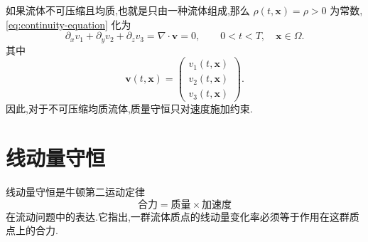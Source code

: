 \begin{note}[不可压缩均质流体]\label{note:incompressible-homogeneous}
如果流体不可压缩且均质,也就是只由一种流体组成,那么 $\rho(t,\bm{x})=\rho>0$ 为常数,\cref{eq:continuity-equation} 化为
\begin{equation}\label{eq:divergence-free}
  \partial_x v_1+\partial_y v_2+\partial_z v_3
  =\nabla\cdot\bm{v}=0,
  \qquad 0<t<T,\quad\bm{x}\in\Omega.
\end{equation}
其中
\begin{equation*}
  \bm{v}(t,\bm{x})=
  \begin{pmatrix}v_1(t,\bm{x})\\v_2(t,\bm{x})\\v_3(t,\bm{x})\end{pmatrix}.
\end{equation*}
因此,对于不可压缩均质流体,质量守恒只对速度施加约束.
\end{note}

\section{线动量守恒}\label{sec:momentum-conservation}

\begin{note}[牛顿第二运动定律]\label{note:newton-second-law}
线动量守恒是牛顿第二运动定律
\begin{equation}\label{eq:newton-second-law}
  \text{合力}=\text{质量}\times\text{加速度}
\end{equation}
在流动问题中的表达.它指出,一群流体质点的线动量变化率必须等于作用在这群质点上的合力.
\end{note}

